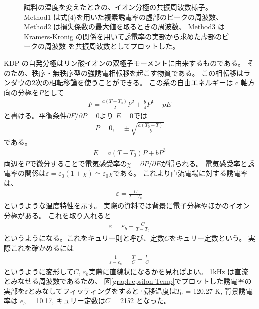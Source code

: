 \documentclass[9pt,dvipdfmx,a4paper]{jsarticle}
\begin{document}
\begin{figure}[t]
\begin{minipage}[t]{0.48\columnwidth}
        \caption{\small{試料の温度を変えたときの、イオン分極の共振周波数様子。
        Method1 は式(4)を用いた複素誘電率の虚部のピークの周波数、
        Method2 は損失係数の最大値を取るときの周波数、
        Method3 は Kramers-Kronig の関係を用いて誘電率の実部から求めた虚部のピークの周波数
        を共振周波数としてプロットした。}}
        \label{graph:ResF-Temp}
    \end{minipage}
\end{figure}

KDP の自発分極はリン酸イオンの双極子モーメントに由来するものである\cite{onodera}。
そのため、秩序・無秩序型の強誘電相転移を起こす物質である。
この相転移はランダウの2次の相転移論を使うことができる。
この系の自由エネルギーは c 軸方向の分極を\(P\)として
\begin{align}
    F = \frac{a(T-T_0)}{2}P^2 + \frac{b}{4}P^4 -pE
\end{align}
と書ける。平衡条件\(\partial F/\partial P = 0\)より
\(E=0\)では
\begin{align}
    P = 0,\quad \pm\sqrt{\frac{a(T_0-T)}{b}}
\end{align}
である。
\begin{align}
    E = a(T-T_0)P + bP^3
\end{align}
両辺を\(P\)で微分することで電気感受率の\(\chi=\partial P/\partial E\)が得られる。
電気感受率と誘電率の関係は\(\varepsilon = \varepsilon_0(1+\chi)\simeq \varepsilon_0\chi\)である。
これより直流電場に対する誘電率は、
\begin{align}
    \varepsilon = \frac{C}{T-T_0}
\end{align}
というような温度特性を示す。
実際の資料では背景に電子分極やほかのイオン分極がある。
これを取り入れると
\begin{align}
    \varepsilon = \varepsilon_b + \frac{C}{T-T_0}
\end{align}
というようになる。これをキュリー則と呼び、定数\(C\)をキュリー定数という。
実際これを確かめるには
\begin{align}
    \frac{1}{\varepsilon-\varepsilon_b} = \frac{T}{C}-\frac{T_0}{C}
\end{align}
というように変形して\(C,\,\varepsilon_b\)実際に直線状になるかを見ればよい。
1kHz は直流とみなせる周波数であるため、
図\ref{graph:epsilon-Temp}でプロットした誘電率の実部を\(\varepsilon\)とみなしてフィッティングをすると
転移温度は\(T_0\) = 120.27 K, 背景誘電率は \(e_b\) = 10.17, キュリー定数は\(C\) = 2152 となった。
\end{document}
